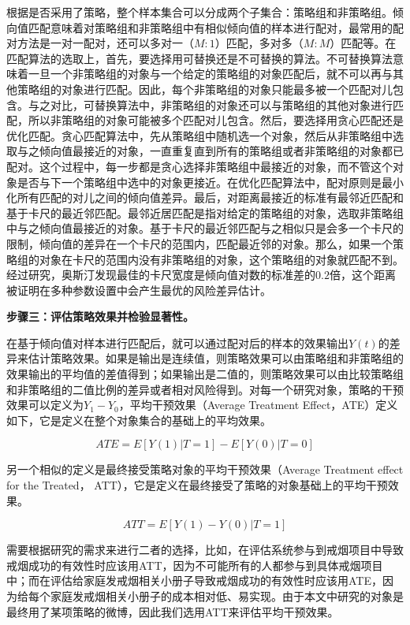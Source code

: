 根据是否采用了策略，整个样本集合可以分成两个子集合：策略组和非策略组。倾向值匹配意味着对策略组和非策略组中有相似倾向值的样本进行配对，最常用的配对方法是一对一配对，还可以多对一（$M:1$）匹配，多对多（$M:M$）匹配等。在匹配算法的选取上，首先，要选择用可替换还是不可替换的算法。不可替换算法意味着一旦一个非策略组的对象与一个给定的策略组的对象匹配后，就不可以再与其他策略组的对象进行匹配。因此，每个非策略组的对象只能最多被一个匹配对儿包含。与之对比，可替换算法中，非策略组的对象还可以与策略组的其他对象进行匹配，所以非策略组的对象可能被多个匹配对儿包含。然后，要选择用贪心匹配还是优化匹配。贪心匹配算法中，先从策略组中随机选一个对象，然后从非策略组中选取与之倾向值最接近的对象，一直重复直到所有的策略组或者非策略组的对象都已配对。这个过程中，每一步都是贪心选择非策略组中最接近的对象，而不管这个对象是否与下一个策略组中选中的对象更接近。在优化匹配算法中，配对原则是最小化所有匹配的对儿之间的倾向值差异。最后，对距离最接近的标准有最邻近匹配和基于卡尺的最近邻匹配。最邻近居匹配是指对给定的策略组的对象，选取非策略组中与之倾向值最接近的对象。基于卡尺的最近邻匹配与之相似只是会多一个卡尺的限制，倾向值的差异在一个卡尺的范围内，匹配最近邻的对象。那么，如果一个策略组的对象在卡尺的范围内没有非策略组的对象，这个策略组的对象就匹配不到。经过研究，奥斯汀\cite{2011b}发现最佳的卡尺宽度是倾向值对数的标准差的$0.2$倍，这个距离被证明在多种参数设置中会产生最优的风险差异估计。

\textbf{步骤三：评估策略效果并检验显著性。}

在基于倾向值对样本进行匹配后，就可以通过配对后的样本的效果输出$Y(t)$的差异来估计策略效果。如果是输出是连续值，则策略效果可以由策略组和非策略组的效果输出的平均值的差值得到；如果输出是二值的，则策略效果可以由比较策略组和非策略组的二值比例的差异或者相对风险得到。对每一个研究对象，策略的干预效果可以定义为$Y_1-Y_0$，平均干预效果（Average Treatment Effect，ATE）定义如下，它是定义在整个对象集合的基础上的平均效果。

\begin{equation}
ATE = E[Y(1)|T=1] - E[Y(0)|T=0]
\end{equation}

另一个相似的定义是最终接受策略对象的平均干预效果（Average Treatment effect for the Treated， ATT），它是定义在最终接受了策略的对象基础上的平均干预效果。

\begin{equation}
ATT = E[Y(1) - Y(0) | T = 1]
\end{equation}

需要根据研究的需求来进行二者的选择，比如，在评估系统参与到戒烟项目中导致
戒烟成功的有效性时应该用ATT，因为不可能所有的人都参与到具体戒烟项目中；而在评估给家庭发戒烟相关小册子导致戒烟成功的有效性时应该用ATE，因为给每个家庭发戒烟相关小册子的成本相对低、易实现。由于本文中研究的对象是最终用了某项策略的微博，因此我们选用ATT来评估平均干预效果。

